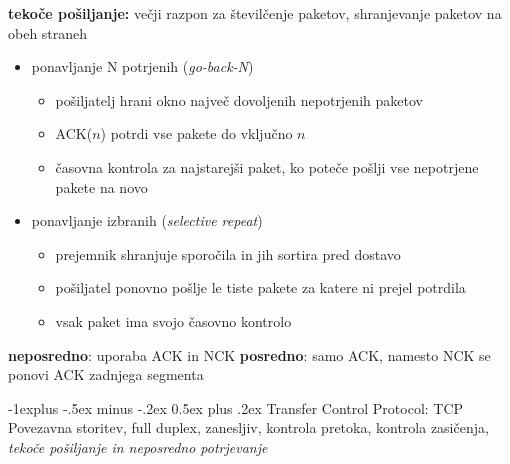 \documentclass[a4paper,8pt]{extarticle}
\makeatletter
\renewcommand{\subsection}{\@startsection{subsection}{2}{0mm}%
                                {-1explus -.5ex minus -.2ex}%
                                {0.5ex plus .2ex}%
                                {\normalfont\normalsize\bfseries}}
\makeatother
\begin{document}
\begin{multicols}{4}
\textbf{tekoče pošiljanje:} večji razpon za številčenje paketov, shranjevanje paketov na obeh straneh
\begin{itemize}
	\item ponavljanje N potrjenih (\emph{go-back-N})
	\begin{itemize}
		\item pošiljatelj hrani okno največ dovoljenih nepotrjenih paketov
		\item ACK($n$) potrdi vse pakete do vključno $n$
		\item časovna kontrola za najstarejši paket, ko poteče pošlji vse nepotrjene pakete na novo
	\end{itemize}
	\item ponavljanje izbranih (\emph{selective repeat})
	\begin{itemize}
		\item prejemnik shranjuje sporočila in jih sortira pred dostavo
		\item pošiljatel ponovno pošlje le tiste pakete za katere ni prejel potrdila
		\item vsak paket ima svojo časovno kontrolo
	\end{itemize}
\end{itemize}

\textbf{neposredno}: uporaba ACK in NCK
\textbf{posredno}: samo ACK, namesto NCK se ponovi ACK zadnjega segmenta



\subsection{Transfer Control Protocol: TCP}
Povezavna storitev, full duplex, zanesljiv, kontrola pretoka, kontrola zasičenja, \emph{tekoče pošiljanje in neposredno potrjevanje}


\end{multicols}
\end{document}

